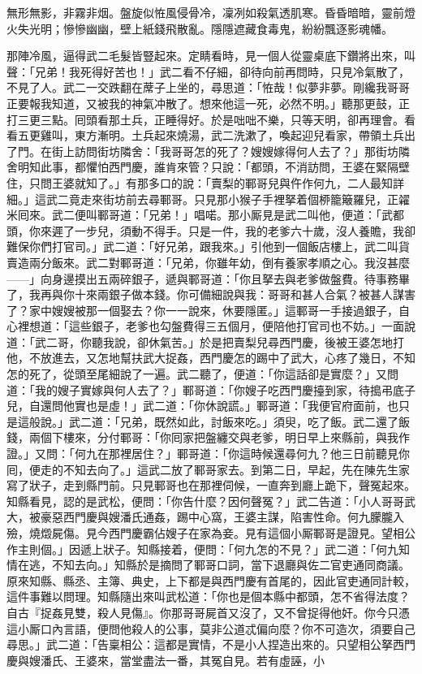 \begin{myquote}
無形無影，非霧非烟。盤旋似恠風侵骨冷，凜冽如殺氣透肌寒。昏昏暗暗，靈前燈火失光明；慘慘幽幽，壁上紙錢飛散亂。隱隱遮藏食毒鬼，紛紛飄逐影魂幡。
\end{myquote}

那陣冷風，逼得武二毛髮皆豎起來。{}定睛看時，見一個人從靈桌底下鑽將出來，叫聲：「兄弟！我死得好苦也！」武二看不仔細，卻待向前再問時，只見冷氣散了，不見了人。武二一交跌翻在蓆子上坐的，尋思道：「恠哉！似夢非夢。剛纔我哥哥正要報我知道，又被我的神氣冲散了。想來他這一死，必然不明。」聽那更鼓，正打三更三點。囘頭看那土兵，正睡得好。於是咄咄不樂，只等天明，卻再理會。看看五更雞叫，東方漸明。土兵起來燒湯，武二洗漱了，喚起迎兒看家，帶領土兵出了門。在街上訪問街坊隣舍：「我哥哥怎的死了？嫂嫂嫁得何人去了？」那街坊隣舍明知此事，都懼怕西門慶，誰肯來管？只說：「都頭，不消訪問，王婆在緊隔壁住，只問王婆就知了。」有那多口的說：「賣梨的鄆哥兒與仵作何九，二人最知詳細。」這武二竟走來街坊前去尋鄆哥。只見那小猴子手裡拏着個桺籠簸羅兒，正糴米囘來。武二便叫鄆哥道：「兄弟！」唱喏。那小厮見是武二叫他，便道：「武都頭，你來遲了一步兒，須動不得手。只是一件，我的老爹六十歲，沒人養贍，我卻難保你們打官司。」{}武二道：「好兄弟，跟我來。」引他到一個飯店樓上，武二叫貨賣造兩分飯來。武二對鄆哥道：「兄弟，你雖年幼，倒有養家孝順之心。我沒甚麼——」向身邊摸出五兩碎銀子，遞與鄆哥道：「你且拏去與老爹做盤費。待事務畢了，我再與你十來兩銀子做本錢。你可備細說與我：哥哥和甚人合氣？被甚人謀害了？家中嫂嫂被那一個娶去？你一一說來，休要隱匿。」這鄆哥一手接過銀子，自心裡想道：「這些銀子，老爹也勾盤費得三五個月，便陪他打官司也不妨。」一面說道：「武二哥，你聽我說，卻休氣苦。」於是把賣梨兒尋西門慶，後被王婆怎地打他，不放進去，又怎地幫扶武大捉姦，西門慶怎的踢中了武大，心疼了幾日，不知怎的死了，從頭至尾細說了一遍。武二聽了，便道：「你這話卻是實麼？」又問道：「我的嫂子實嫁與何人去了？」鄆哥道：「你嫂子吃西門慶擡到家，待搗弔底子兒，自還問他實也是虛！」武二道：「你休說謊。」鄆哥道：「我便官府面前，也只是這般說。」{}武二道：「兄弟，既然如此，討飯來吃。」須臾，吃了飯。武二還了飯錢，兩個下樓來，分付鄆哥：「你囘家把盤纏交與老爹，明日早上來縣前，與我作證。」又問：「何九在那裡居住？」鄆哥道：「你這時候還尋何九？他三日前聽見你囘，便走的不知去向了。」{}這武二放了鄆哥家去。到第二日，早起，先在陳先生家寫了狀子，走到縣門前。只見鄆哥也在那裡伺候，一直奔到廳上跪下，聲冤起來。知縣看見，認的是武松，便問：「你告什麼？因何聲冤？」武二告道：「小人哥哥武大，被豪惡西門慶與嫂潘氏通姦，踢中心窩，王婆主謀，陷害性命。何九朦朧入殮，燒燬屍傷。見今西門慶霸佔嫂子在家為妾。見有這個小厮鄆哥是證見。望相公作主則個。」因遞上狀子。知縣接着，便問：「何九怎的不見？」武二道：「何九知情在逃，不知去向。」知縣於是摘問了鄆哥口詞，當下退廳與佐二官吏通同商議。原來知縣、縣丞、主簿、典史，上下都是與西門慶有首尾的，因此官吏通同計較，這件事難以問理。知縣隨出來叫武松道：「你也是個本縣中都頭，怎不省得法度？自古『捉姦見雙，殺人見傷』。你那哥哥屍首又沒了，又不曾捉得他奸。你今只憑這小厮口內言語，便問他殺人的公事，莫非公道忒偏向麼？你不可造次，須要自己尋思。」武二道：「告稟相公：這都是實情，不是小人捏造出來的。只望相公拏西門慶與嫂潘氏、王婆來，當堂盡法一番，其冤自見。若有虛誣，小
